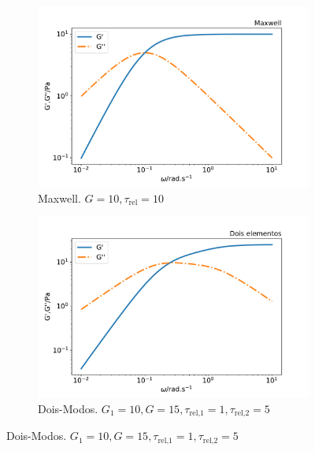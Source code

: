 			\begin{figure}[H]
				\begin{subfigure}[t]{.5\textwidth}
					\centering
					\includegraphics[width=\textwidth]{./imagens/reologia/modelos_comparativo_max}
					\caption{Maxwell. \(G=10, \tau_{\textrm{rel}}=10\)}
					\label{fig:comparativo_modelo_maxwell}
				\end{subfigure}%
				\begin{subfigure}[t]{.5\textwidth}
					\centering
					\includegraphics[width=\textwidth]{./imagens/reologia/modelos_comparativo_doismodos}
					\caption{Dois-Modos. \(G_1=10, G=15, \tau_{\textrm{rel,1}}=1,  \tau_{\textrm{rel,2}}=5\)}
					\label{fig:comparativo_modelo_doismodos}
				\end{subfigure}
			

\end{figure}

